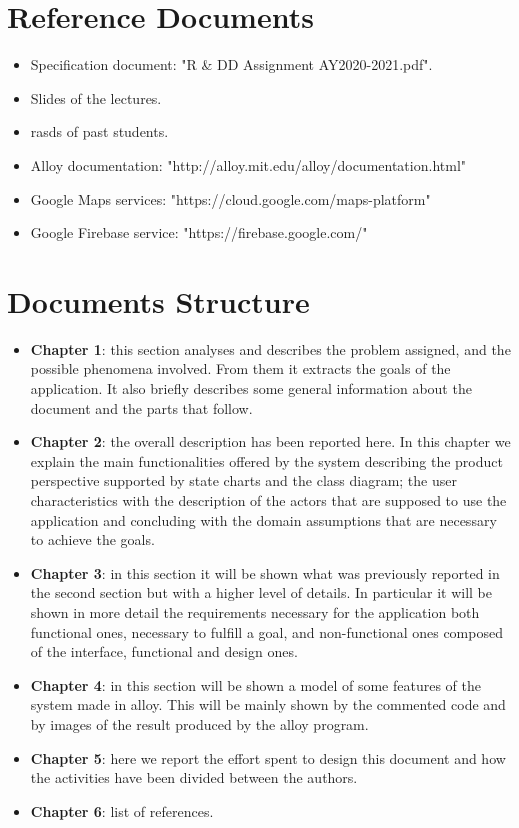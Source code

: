 \section{Reference Documents}

\begin{itemize}
    \item Specification document: "R \& DD Assignment AY2020-2021.pdf".
    \item Slides of the lectures.
    \item \glspl{rasd} of past students.
    \item Alloy documentation: "http://alloy.mit.edu/alloy/documentation.html"
    \item Google Maps services: "https://cloud.google.com/maps-platform"
    \item Google Firebase service: "https://firebase.google.com/"
\end{itemize}



\section{Documents Structure}

\begin{itemize}
    \item \textbf{Chapter 1}: this section analyses and describes the problem assigned, and the possible phenomena involved. From them it extracts the goals of the application. It also briefly describes some general information about the document and the parts that follow.
    \item \textbf{Chapter 2}: the overall description has been reported here. In this chapter we explain the main functionalities offered by the system describing the product perspective supported by state charts and the class diagram; the user characteristics with the description of the actors that are supposed to use the application and concluding with the domain assumptions that are necessary to achieve the goals.
    \item \textbf{Chapter 3}: in this section it will be shown what was previously reported in the second section but with a higher level of details. In particular it will be shown in more detail the requirements necessary for the application both functional ones, necessary to fulfill a goal, and non-functional ones composed of the interface, functional and design ones.
    \item \textbf{Chapter 4}: in this section will be shown a model of some features of the system made in alloy. This will be mainly shown by the commented code and by images of the result produced by the alloy program.
    \item \textbf{Chapter 5}: here we report the effort spent to design this document and how the activities have been divided between the authors.
    \item \textbf{Chapter 6}: list of references.
\end{itemize}